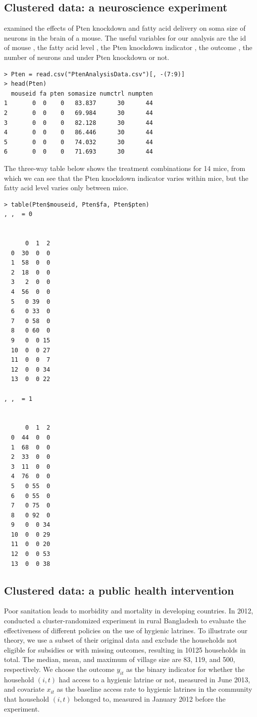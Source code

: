\subsection{Clustered data: a neuroscience experiment} 


\citet{moen2016analyzing} examined the effects of Pten knockdown and fatty acid delivery on soma size of neurons in the brain of a mouse. The useful variables for our analysis are the id of mouse , the fatty acid level , the Pten knockdown indicator , the outcome , the number of neurons  and  under Pten knockdown or not.


\begin{lstlisting}
> Pten = read.csv("PtenAnalysisData.csv")[, -(7:9)]
> head(Pten)
  mouseid fa pten somasize numctrl numpten
1       0  0    0   83.837      30      44
2       0  0    0   69.984      30      44
3       0  0    0   82.128      30      44
4       0  0    0   86.446      30      44
5       0  0    0   74.032      30      44
6       0  0    0   71.693      30      44
\end{lstlisting}

The three-way table below shows the treatment combinations for 14 mice, from which
we can see that the Pten knockdown indicator varies within mice, but the fatty acid level varies only between mice. 
\begin{lstlisting}
> table(Pten$mouseid, Pten$fa, Pten$pten)
, ,  = 0

    
      0  1  2
  0  30  0  0
  1  58  0  0
  2  18  0  0
  3   2  0  0
  4  56  0  0
  5   0 39  0
  6   0 33  0
  7   0 58  0
  8   0 60  0
  9   0  0 15
  10  0  0 27
  11  0  0  7
  12  0  0 34
  13  0  0 22

, ,  = 1

    
      0  1  2
  0  44  0  0
  1  68  0  0
  2  33  0  0
  3  11  0  0
  4  76  0  0
  5   0 55  0
  6   0 55  0
  7   0 75  0
  8   0 92  0
  9   0  0 34
  10  0  0 29
  11  0  0 20
  12  0  0 53
  13  0  0 38
  \end{lstlisting}


\subsection{Clustered data: a public health intervention} 



Poor sanitation leads to morbidity and mortality in developing countries. In 2012, \citet{guiteras2015encouraging} conducted a cluster-randomized experiment in rural Bangladesh to evaluate the effectiveness of different policies on the use of hygienic latrines. To illustrate our theory, we use a subset of their original data and exclude the households not eligible for subsidies or with missing outcomes, resulting in 10125 households in total. The median, mean, and maximum of village size are 83, 119, and 500, respectively.
We choose the outcome $y_{it}$ as the binary indicator for whether the household $(i,t)$ had access to a hygienic latrine or not, measured in June 2013, and covariate $x_{it}$ as the baseline access rate to hygienic latrines in the community that household $(i,t)$ belonged to, measured in January 2012 before the experiment.

